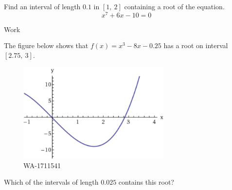 \documentclass[12pt,addpoints, answers, fleqn]{exam}
\begin{document}
\begin{teacher}
\begin{questions}
Find an interval of length $0.1$ in $\left[1, \ 2 \right]$ containing a root of the equation.
\[
x^7 + 6x - 10 = 0
\]

\begin{solution}
Work
\end{solution}

\question 	%

The figure below shows that $f\left(x\right) = x^3 - 8x - 0.25$ has a root on interval $\left[2.75, \ 3 \right]$.

\begin{figure}[htbp] %
   \centering
   \includegraphics[width=3in]{./graphics/1711541.pdf} 
   \caption{WA-1711541}
   \label{fig:1711541}
\end{figure}
Which of the intervals of length $0.025$ contains this root?
\end{questions}
\end{teacher}
\end{document}
